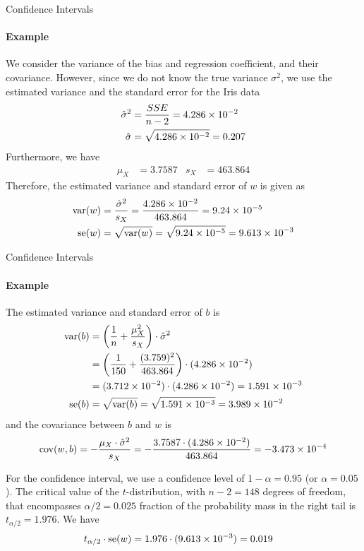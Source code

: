 %
%
\begin{frame}{Confidence Intervals}
\framesubtitle{Example}
We consider the
    variance of the bias and regression coefficient, and their
    covariance. However, since we do not know the true variance
    $\sigma^2$, we use the estimated variance and the standard error for
    the Iris data
    \begin{align*}
        \hat{\sigma}^2 & = \frac{SSE}{n-2} = 4.286 \times 10^{-2}\\
        \hat{\sigma} & = \sqrt{4.286 \times 10^{-2}} = 0.207
    \end{align*}
    Furthermore, we have 
    \begin{align*}
        \mu_X & = 3.7587 & s_X & = 463.864
    \end{align*}
    Therefore, the estimated variance and standard error of $w$ is given as
    \begin{align*}
        \operatorname{var}(w) & = \frac{\hat{\sigma}^2}{s_X} = \frac{4.286 \times
        10^{-2}}{463.864} = 9.24\times 10^{-5}\\
        \operatorname{se}(w) & = \sqrt{\operatorname{var}(w)} = \sqrt{9.24\times 10^{-5}} = 9.613
        \times 10^{-3}
    \end{align*}
\end{frame}

\begin{frame}{Confidence Intervals}
\framesubtitle{Example}
    The estimated variance and standard error of $b$ is
    \begin{align*}
        \operatorname{var}(b) & = \left(\frac{1}{n} + \frac{\mu_X^2}{s_X}\right)\cdot \hat{\sigma}^2\\
        & = \left(\frac{1}{150} + \frac{(3.759)^2}{463.864}\right) \cdot
        (4.286 \times 10^{-2}) \\
        & = (3.712 \times 10^{-2}) \cdot
        (4.286 \times 10^{-2}) = 1.591 \times 10^{-3}\\
        \operatorname{se}(b) & = \sqrt{\operatorname{var}(b)} = \sqrt{1.591 \times 10^{-3}} =
        3.989 \times 10^{-2}
    \end{align*}
    and the covariance between $b$ and $w$ is
    \begin{align*}
        \operatorname{cov}(w, b) = - \frac{\mu_X \cdot \hat{\sigma}^2}{s_X} = -
        \frac{3.7587 \cdot (4.286 \times 10^{-2})}{463.864} = -3.473 \times
        10^{-4}
    \end{align*}
    
    For the confidence interval, we use a confidence level of
    $1-\alpha=0.95$ (or $\alpha=0.05$). 
    The critical value of the $t$-distribution, with $n-2=148$
    degrees of freedom, that
    encompasses $\alpha/2 = 0.025$ fraction of the probability mass in
    the right tail is
    $t_{\alpha/2} = 1.976$. 
    We have
    \begin{align*}
        t_{\alpha/2} \cdot \operatorname{se}(w) & = 1.976 
        \cdot (9.613 \times 10^{-3}) = 0.019
    \end{align*}
\end{frame}

